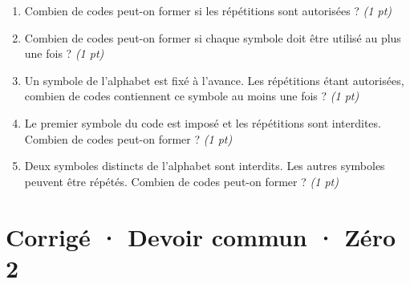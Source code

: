\begin{enumerate}

\item Combien de codes peut-on former si les répétitions sont autorisées ? \hfill\textit{(1 pt)}

\item Combien de codes peut-on former si chaque symbole doit être utilisé au plus une fois ? \hfill\textit{(1 pt)}

\item Un symbole de l'alphabet est fixé à l'avance. Les répétitions étant autorisées, combien de codes contiennent ce symbole au moins une fois ? \hfill\textit{(1 pt)}

\item Le premier symbole du code est imposé et les répétitions sont interdites. Combien de codes peut-on former ? \hfill\textit{(1 pt)}

\item Deux symboles distincts de l'alphabet sont interdits. Les autres symboles peuvent être répétés. Combien de codes peut-on former ? \hfill\textit{(1 pt)}

\end{enumerate}

\ifprof\clearpage

\section*{Corrigé · Devoir commun · Zéro 2}\label{cor:3-2}

